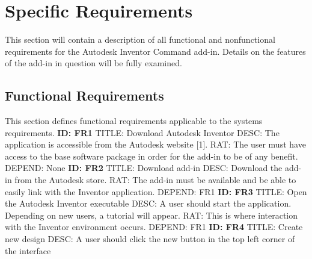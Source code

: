 \documentclass[onecolumn, draftclsnofoot,10pt, compsoc]{IEEEtran}
\begin{document}
\section{Specific Requirements}
This section will contain a description of all functional and nonfunctional requirements for the Autodesk Inventor Command add-in. Details on the features of the add-in in question will be fully examined.

\subsection{Functional Requirements}
This section defines functional requirements applicable to the systems requirements.
\newline
\newline
\textbf{ID: FR1}
\newline
TITLE: Download Autodesk Inventor
\newline
DESC: The application is accessible from the Autodesk website [1]. 
\newline
RAT:  The user must have access to the base software package in order for the add-in to be of any benefit.
\newline
DEPEND: None
\newline
\newline
\textbf{ID: FR2}
\newline
TITLE: Download add-in 
\newline
DESC: Download the add-in from the Autodesk store.
\newline
RAT:  The add-in must be available and be able to easily link with the Inventor application.
\newline
DEPEND: FR1
\newline
\newline
\textbf{ID: FR3}
\newline
TITLE: Open the Autodesk Inventor executable 
\newline
DESC: A user should start the application. Depending on new users, a tutorial will appear.\newline
RAT: This is where interaction with the Inventor environment occurs.  \newline
DEPEND: FR1\newline
\newline
\textbf{ID: FR4}\newline
TITLE: Create new design\newline
DESC: A user should click the new button in the top left corner of the interface\newline
\end{document}
